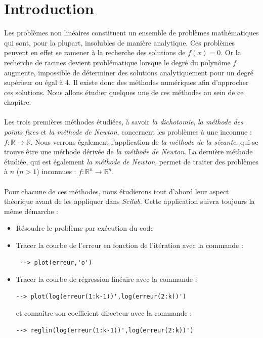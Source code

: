 \documentclass[a4paper,10pt]{report}
\begin{document}
\section{Introduction}
\indent Les problèmes non linéaires constituent un ensemble de problèmes mathématiques qui sont, pour la plupart, insolubles de manière analytique. Ces problèmes peuvent en effet se ramener à la recherche des solutions de $f(x)=0$. Or la recherche de racines devient problématique lorsque le degré du polynôme $f$ augmente, impossible de déterminer des solutions analytiquement pour un degré supérieur ou égal à 4. Il existe donc des méthodes numériques afin d'approcher ces solutions. Nous allons étudier quelques une de ces méthodes au sein de ce chapitre.\\ \\
\indent Les trois premières méthodes étudiées, à savoir \textit{la dichotomie}, \textit{la méthode des points fixes} et \textit{la méthode de Newton}, concernent les problèmes à une inconnue : $f : \mathbb{R} \longrightarrow \mathbb{R}$. Nous verrons également l'application de \textit{la méthode de la sécante}, qui se trouve être une méthode dérivée de \textit{la méthode de Newton}. La dernière méthode étudiée, qui est également \textit{la méthode de Newton}, permet de traiter des problèmes à $n$ ($n>1$) inconnues : $f : \mathbb{R}^n \longrightarrow \mathbb{R}^n$.\\ \\
\indent Pour chacune de ces méthodes, nous étudierons tout d'abord leur aspect théorique avant de les appliquer dans \textit{Scilab}. Cette application suivra toujours la même démarche :
\begin{itemize}
\item Résoudre le problème par exécution du code
\item Tracer la courbe de l'erreur en fonction de l'itération avec la commande : \begin{verbatim} --> plot(erreur,'o')
\end{verbatim}
\item Tracer la courbe de régression linéaire avec la commande : \begin{verbatim}
--> plot(log(erreur(1:k-1))',log(erreur(2:k))')
\end{verbatim} et connaître son coefficient directeur avec la commande : \begin{verbatim}
--> reglin(log(erreur(1:k-1))',log(erreur(2:k))')
\end{verbatim}
\end{itemize}
\end{document}
